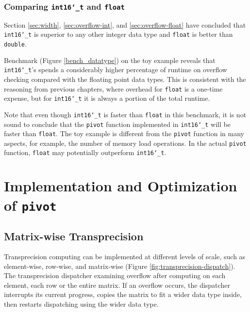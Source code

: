 \documentclass[logo,bsc,singlespacing,parskip]{infthesis}
\newcommand{\dtshort}{\texttt{int16\char`_t}}
\newcommand{\dtfloat}{\texttt{float}}
\newcommand{\dtdouble}{\texttt{double}}
\newcommand{\pivot}{\texttt{pivot}}
\begin{document}
\subsection{Comparing \dtshort{} and \dtfloat{}}

Section \ref{sec:width}, \ref{sec:overflow-int}, and \ref{sec:overflow-float}
have concluded that \dtshort{} is superior to any other integer data type and
\dtfloat{} is better than \dtdouble{}. 


Benchmark (Figure \ref{bench_datatype}) on the toy example reveals that
\dtshort{}'s spends a considerably higher percentage of runtime on overflow
checking compared with the floating point data types. This is consistent with
the reasoning from previous chapters, where overhead for \dtfloat{} is a
one-time expense, but for \dtshort{} it is always a portion of the total
runtime. 

Note that even though \dtshort{} is faster than \dtfloat{} in this benchmark, it is
not sound to conclude that the \pivot{} function implemented in \dtshort{} will be
faster than \dtfloat{}. The toy example is different from the \pivot{} function in
many aspects, for example, the number of memory load operations. In the actual
\pivot{} function, \dtfloat{} may potentially outperform \dtshort{}. 




\chapter{Implementation and Optimization of \pivot{}}

\section{Matrix-wise Transprecision}
Transprecision computing can be implemented at different levels of scale, such
as element-wise, row-wise, and matrix-wise (Figure
\ref{fig:transprecision-dispatch}). The transprecision dispatcher examining
overflow after computing on each element, each row or the entire matrix. If an
overflow occurs, the dispatcher interrupts its current progress, copies the 
matrix to fit a wider data type inside, then restarts dispatching using the wider
data type. 
\end{document}
